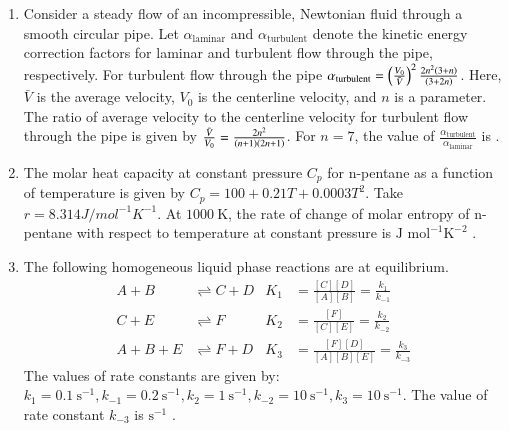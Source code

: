 \documentclass[journal,12pt,onecolumn]{IEEEtran}
\theoremstyle{remark}
\begin{document}
\begin{enumerate}
\hfill{}

\item Consider a steady flow of an incompressible, Newtonian fluid through a smooth circular pipe. Let $\alpha_{\text{laminar}}$ and $\alpha_{\text{turbulent}}$ denote the kinetic energy correction factors for laminar and turbulent flow through the pipe, respectively. For turbulent flow through the pipe $\alpha_{\text{turbulent}} = \left(\frac{V_0}{\bar{V}}\right)^2 \frac{2n^2 \left(3+n\right)}{\left(3+2n\right)}$. Here, $\bar{V}$ is the average velocity, $V_0$ is the centerline velocity, and $n$ is a parameter. The ratio of average velocity to the centerline velocity for turbulent flow through the pipe is given by $\frac{\bar{V}}{V_0} = \frac{2n^2}{\left(n+1\right)\left(2n+1\right)}$. For $n=7$, the value of $\frac{\alpha_{\text{turbulent}}}{\alpha_{\text{laminar}}}$ is \underline{\hspace{2cm}} .

\hfill{}

\item The molar heat capacity at constant pressure $C_p$  for n-pentane as a function of temperature  is given by $C_p = 100 + 0.21T + 0.0003 T^2$. Take $ r=8.314J/mol^{-1}{K}^{-1}$. At $1000~\text{K}$, the rate of change of molar entropy of n-pentane with respect to temperature at constant pressure is \underline{\hspace{2cm}} $\text{J mol}^{-1}\text{K}^{-2}$ .

\hfill{}

\item The following homogeneous liquid phase reactions are at equilibrium.
\begin{align*}
A + B &\rightleftharpoons C + D & K_1 &= \frac{[C][D]}{[A][B]} = \frac{k_1}{k_{-1}} \\
C + E &\rightleftharpoons F & K_2 &= \frac{[F]}{[C][E]} = \frac{k_2}{k_{-2}} \\
A + B + E &\rightleftharpoons F + D & K_3 &= \frac{[F][D]}{[A][B][E]} = \frac{k_3}{k_{-3}}
\end{align*}
The values of rate constants are given by: $k_1 = 0.1~\text{s}^{-1}, k_{-1} = 0.2~\text{s}^{-1}, k_2 = 1~\text{s}^{-1}, k_{-2} = 10~\text{s}^{-1}, k_3 = 10~\text{s}^{-1}$. The value of rate constant $k_{-3}$ is \underline{\hspace{2cm}} $\text{s}^{-1}$ .


\end{enumerate}
\end{document}

